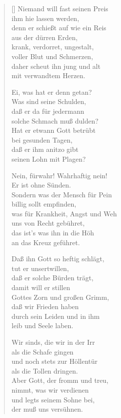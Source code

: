 \begin{multicols}{2}
\begin{verse}[\versewidth]
 Niemand will fast seinen Preis\\
ihm hie lassen werden,\\
denn er schießt auf wie ein Reis\\
aus der dürren Erden,\\
krank, verdorret, ungestalt,\\
voller Blut und Schmerzen,\\
daher scheut ihn jung und alt\\
mit verwandtem Herzen.

 Ei, was hat er denn getan?\\
Was sind seine Schulden,\\
daß er da für jedermann\\
solche Schmach muß dulden?\\
Hat er etwann Gott betrübt\\
bei gesunden Tagen,\\
daß er ihm anitzo gibt\\
seinen Lohn mit Plagen?

 Nein, fürwahr! Wahrhaftig nein!\\
Er ist ohne Sünden.\\
Sondern was der Mensch für Pein\\
billig sollt empfinden,\\
was für Krankheit, Angst und Weh\\
uns von Recht gebühret,\\
das ist's was ihn in die Höh\\
an das Kreuz geführet.

 Daß ihn Gott so heftig schlägt,\\
tut er unsertwillen,\\
daß er solche Bürden trägt,\\
damit will er stillen\\
Gottes Zorn und großen Grimm,\\
daß wir Frieden haben\\
durch sein Leiden und in ihm\\
leib und Seele laben.

 Wir sinds, die wir in der Irr\\
als die Schafe gingen\\
und noch stets zur Höllentür\\
als die Tollen dringen.\\
Aber Gott, der fromm und treu,\\
nimmt, was wir verdienen\\
und legts seinem Sohne bei,\\
der muß uns versühnen.


\end{verse}
\end{multicols}
